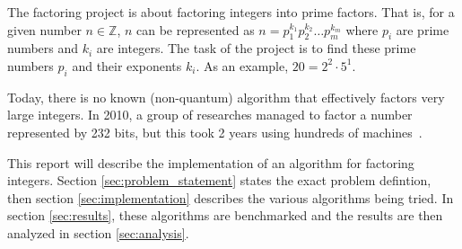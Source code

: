 The factoring project is about factoring integers into prime factors. That is,
for a given number $n \in \mathbb{Z}$, $n$ can be represented as 
$n = p_1^{k_1}p_2^{k_2} \ldots p_m^{k_m}$ where $p_i$ are prime numbers and
$k_i$ are integers. The task of the project is to find these prime numbers
$p_i$ and their exponents $k_i$. As an example, $20 = 2^2 \cdot 5^1$.

Today, there is no known (non-quantum) algorithm that effectively factors very 
large integers. 
In 2010, a group of researches managed to factor a number represented by
232 bits, but this took 2 years using hundreds of machines~\cite{rsa}.

This report will describe the implementation of an algorithm for factoring
integers. Section \ref{sec:problem_statement} states the exact problem
defintion, then section \ref{sec:implementation} describes the various
algorithms being tried. In section \ref{sec:results}, these algorithms
are benchmarked and the results are then analyzed in section \ref{sec:analysis}.
